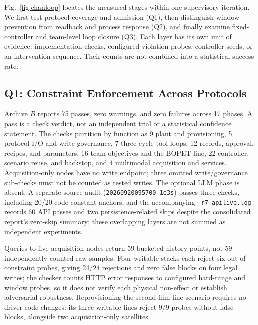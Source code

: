Fig.~\ref{fig:chanloop} locates the measured stages within one supervisory
iteration. We first test protocol coverage and admission (Q1), then distinguish
window prevention from readback and process response (Q2), and finally examine
fixed-controller and team-level loop closure (Q3). Each layer has its own
unit of evidence: implementation checks, configured violation probes,
controller seeds, or an intervention sequence. Their counts are not combined
into a statistical success rate.



\subsection{Q1: Constraint Enforcement Across Protocols}
\label{sec:suite}\label{sec:port}\label{sec:dynamic}\label{sec:plc}\label{sec:govsurface}
Archive $B$ reports 75 passes, zero warnings, and zero failures across 17
phases. A pass is a check verdict, not an independent trial or a statistical
confidence statement. The checks partition by function as 9 plant and
provisioning, 5 protocol I/O and write governance, 7 three-cycle tool loops,
12 records, approval, recipes, and parameters, 16 team objectives and the
BOPET line, 22 controller, scenario reuse, and backstop, and 4 multimodal
acquisition and services. Acquisition-only nodes have no write endpoint; three
omitted write/governance sub-checks must not be counted as tested writes. The
optional LLM phase is absent. A separate source audit
(\texttt{20260920095700-1e3s}) passes three checks, including 20/20
code-constant anchors, and the accompanying \texttt{\_r7-apilive.log} records
60 API passes and two persistence-related skips despite the consolidated
report's zero-skip summary; these overlapping layers are not summed as
independent experiments.

Queries to five acquisition nodes return 59 bucketed history points, not
59 independently counted raw samples. Four writable stacks each reject six
out-of-constraint probes, giving 24/24 rejections and zero false blocks on
four legal writes; the checker counts HTTP error responses to configured
hard-range and window probes, so it does not verify each physical non-effect
or establish adversarial robustness. Reprovisioning the second film-line
scenario requires no driver-code changes: its three writable lines reject 9/9
probes without false blocks, alongside two acquisition-only satellites.

